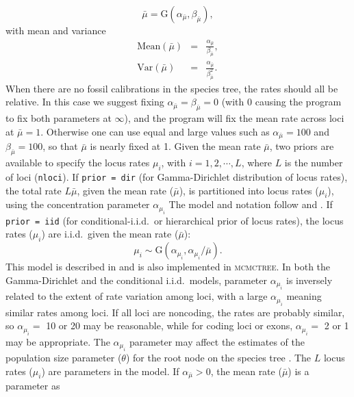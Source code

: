 \documentclass{book}
\numberwithin{equation}{section} \renewcommand{\baselinestretch}{0.55}
\begin{document}
\begin{displaymath}
  \bar{\mu} = \mathrm{G}(\alpha_{\bar{\mu}},\beta_{\bar{\mu}}),
\end{displaymath}
with mean and variance
\begin{eqnarray}
  \textrm{Mean}(\bar{\mu}) & = & \frac{\alpha_{\bar{\mu}}}{\beta_{\bar{\mu}}}, \nonumber \\
  \textrm{Var}(\bar{\mu}) & = & \frac{\alpha_{\bar{\mu}}}{\beta_{\bar{\mu}}^2}. \nonumber 
\end{eqnarray}
When there are no fossil calibrations in the species tree, the rates
should all be relative.  In this case we suggest fixing
$\alpha_{\bar{\mu}}=\beta_{\bar{\mu}}=0$ (with 0 causing the program
to fix both parameters at $\infty$), and the program will fix the mean
rate across loci at $\bar\mu = 1$.  Otherwise one can use equal and
large values such as $\alpha_{\bar{\mu}}=100$ and
$\beta_{\bar{\mu}}=100$, so that $\bar\mu$ is nearly fixed at 1.
Given the mean rate $\bar\mu$, two priors are available to specify the
locus rates $\mu_i$, with $i = 1, 2, \cdots, L$, where $L$ is the
number of loci (\texttt{nloci}).  If \texttt{prior = dir} (for
Gamma-Dirichlet distribution of locus rates), the total rate
$L\bar\mu$, given the mean rate ($\bar\mu$), is partitioned into locus
rates ($\mu_i$), using the concentration parameter $\alpha_{\mu_i}$
The model and notation follow \citet[][eq.~4]{Burgess2008} and
\citet[][eqs.~3-5]{dosReis2014}.  If \texttt{prior = iid} (for
conditional-i.i.d.\ or hierarchical prior of locus rates), the locus
rates ($\mu_i$) are i.i.d.\ given the mean rate ($\bar\mu$):
\begin{displaymath}
  \mu_i \sim \mathrm{G}(\alpha_{\mu_i},\alpha_{\mu_i}/\bar{\mu}).
\end{displaymath}
This model is described in \citet[][eq.~8]{Zhu2015} and is also
implemented in \textsc{mcmctree}.  In both the Gamma-Dirichlet and the
conditional i.i.d.\ models, parameter $\alpha_{\mu_i}$ is inversely
related to the extent of rate variation among loci, with a large
$\alpha_{\mu_i}$ meaning similar rates among loci.  If all loci are
noncoding, the rates are probably similar, so $\alpha_{\mu_i} =$ 10 or
20 may be reasonable, while for coding loci or exons,
$\alpha_{\mu_i} =$ 2 or 1 may be appropriate.  The $\alpha_{\mu_i}$
parameter may affect the estimates of the population size parameter
($\theta$) for the root node on the species tree \citep{Burgess2008}.
The $L$ locus rates ($\mu_i$) are parameters in the model.  If
$\alpha_{\bar{\mu}} > 0$, the mean rate ($\bar\mu$) is a parameter as
\end{document}
